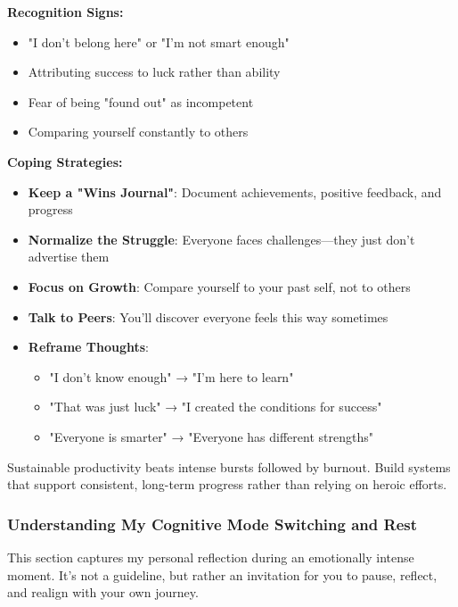 \documentclass[11pt,a4paper]{article}
\begin{document}
\textbf{Recognition Signs:}
\begin{itemize}
    \item "I don't belong here" or "I'm not smart enough"
    \item Attributing success to luck rather than ability
    \item Fear of being "found out" as incompetent
    \item Comparing yourself constantly to others
\end{itemize}

\textbf{Coping Strategies:}
\begin{itemize}
    \item \textbf{Keep a "Wins Journal"}: Document achievements, positive feedback, and progress
    \item \textbf{Normalize the Struggle}: Everyone faces challenges—they just don't advertise them
    \item \textbf{Focus on Growth}: Compare yourself to your past self, not to others
    \item \textbf{Talk to Peers}: You'll discover everyone feels this way sometimes
    \item \textbf{Reframe Thoughts}: 
    \begin{itemize}
        \item "I don't know enough" → "I'm here to learn"
        \item "That was just luck" → "I created the conditions for success"
        \item "Everyone is smarter" → "Everyone has different strengths"
    \end{itemize}
\end{itemize}

\begin{tcolorbox}[colback=yellow!10,colframe=red!50,title={Remember: PhD is a Marathon, Not a Sprint}]
Sustainable productivity beats intense bursts followed by burnout. Build systems that support consistent, long-term progress rather than relying on heroic efforts.
\end{tcolorbox}

\subsubsection{Understanding My Cognitive Mode Switching and Rest}

\begin{tcolorbox}[colback=blue!5,colframe=blue!40,title={\faThumbtack~Author's Note}]
This section captures my personal reflection during an emotionally intense moment. It's not a guideline, but rather an invitation for you to pause, reflect, and realign with your own journey.
\end{tcolorbox}
\end{document}

